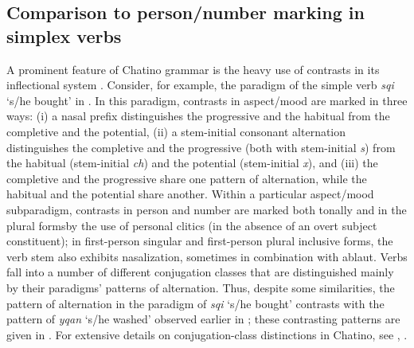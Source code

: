\documentclass[output=paper]{langsci/langscibook}
\begin{document}
\subsection{Comparison to person/number marking in simplex verbs}

A prominent feature of Chatino grammar is the heavy use of  contrasts in its inflectional system \citep{ECruz2011,CruzWoodbury2013}.
Consider, for example, the paradigm of the simple verb \emph{sqi} `s/he bought' in . In this
paradigm, contrasts in aspect/\linebreak mood are marked in three ways:  (i) a nasal prefix distinguishes the progressive and the habitual from the completive and the potential, (ii) a stem-initial consonant alternation distinguishes the completive and the progressive (both with stem-initial \emph{s}) from the habitual (stem-initial \emph{ch}) and the potential (stem-initial \emph{x}), and (iii) the completive and the progressive share one pattern of  alternation, while the habitual and the potential share another.  Within a
particular aspect/mood subparadigm, contrasts in person and number are marked both tonally and\textemdash
in the plural forms\textemdash by the use of personal clitics (in the absence of an overt subject constituent); in first-person singular and first-person plural inclusive forms, the verb stem also exhibits nasalization, sometimes in combination with ablaut.  
Verbs fall into a number of different conjugation classes that are distinguished mainly by their
paradigms' patterns of  alternation. Thus, despite some similarities, the pattern of 
alternation in the paradigm of \emph{sqi} `s/he bought' contrasts with the pattern of \emph{yqan} `s/he washed'
observed earlier in ; these contrasting  patterns are given in . For extensive
details on conjugation-class distinctions in Chatino, see \cite{CruzWoodbury2013}, \cite{WoodburyToAppear}.
\end{document}
